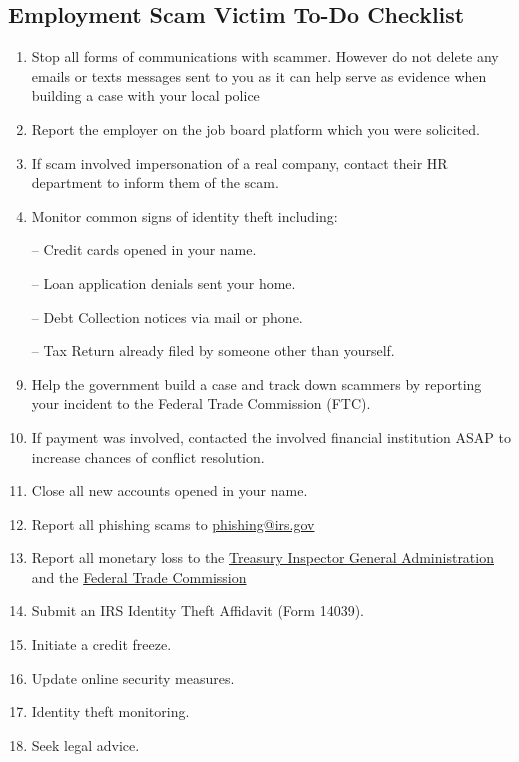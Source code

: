 \begin{fullwidth}
\begin{enumerate}
\end{enumerate}

\subsection{Employment Scam Victim To-Do Checklist} %

\begin{enumerate}
     \item Stop all forms of communications with scammer. However do not delete any emails or texts messages sent to you as it can help serve as evidence when building a case with your local police
     \item Report the employer on the job board platform which you were solicited.
     \item If scam involved impersonation of a real company, contact their HR department to inform them of the scam.
     \item Monitor common signs of identity theft including:
    \item[--] Credit cards opened in your name.
    \item[--] Loan application denials sent your home.
    \item[--] Debt Collection notices via mail or phone.
    \item[--] Tax Return already filed by someone other than yourself.
    \item Help the government build a case and track down scammers by reporting your incident to the Federal Trade Commission (FTC).
    \item If payment was involved, contacted the involved financial institution ASAP to increase chances of conflict resolution.
    \item Close all new accounts opened in your name.
    \item Report all phishing scams to \href{mailto:phishing@irs.gov}{phishing@irs.gov}
    \item Report all monetary loss to the \href{https://www.tigta.gov/hotline?type=IRSScamsandFraud}{Treasury Inspector General Administration} and the \href{https://reportfraud.ftc.gov/#/}{Federal Trade Commission}
    \item Submit an IRS Identity Theft Affidavit (Form 14039).
    \item Initiate a credit freeze.
    \item Update online security measures.
    \item Identity theft monitoring.
    \item Seek legal advice.

    
\end{enumerate}




\end{fullwidth}